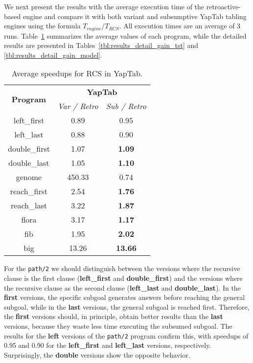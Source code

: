We next present the results with the average execution time of the retroactive-based
engine and compare it with both variant and subsumptive YapTab tabling engines using the formula $T_{engine} / T_{RCS}$.
All execution times are an average of 3 runs. Table~\ref{tbl:results_gain_overview} summarizes the average values of
each program, while the detailed results are presented in Tables~\ref{tbl:results_detail_gain_tst} and
\ref{tbl:results_detail_gain_model}.

\begin{table}[ht]
\centering
  \begin{tabular}{ccc}
   \hline
    \hline
    \multirow{2}{*}{\textbf{Program}} & \multicolumn{2}{c}{\textbf{YapTab}} \\
    & \textit{\small{Var / Retro}} & \textit{\small{Sub / Retro}} \\
   \hline
   \hline
left\_first & 0.89 & 0.95 \\
left\_last & 0.88  & 0.90 \\
double\_first & 1.07 & \textbf{1.09} \\
double\_last & 1.05 & \textbf{1.10} \\
genome & 450.33 & 0.74 \\
reach\_first  & 2.54 & \textbf{1.76} \\
reach\_last  & 3.22 & \textbf{1.87} \\
flora & 3.17 & \textbf{1.17} \\
fib & 1.95 & \textbf{2.02} \\
big & 13.26 & \textbf{13.66} \\
\hline
\hline
\end{tabular}
\caption{Average speedups for RCS in YapTab.}
\label{tbl:results_gain_overview}
\end{table}

For the \texttt{path/2} we should distinguish between the versions where the recursive clause is the first
clause (\textbf{left\_first} and \textbf{double\_first}) and the versions where the recursive clause as the second
clause (\textbf{left\_last} and \textbf{double\_last}). In the \textbf{first} versions, the specific subgoal
generates answers before reaching the general subgoal, while in the \textbf{last} versions, the general subgoal
is reached first. Therefore, the \textbf{first} versions should, in principle, obtain better results than the \textbf{last}
versions, because they waste less time executing the subsumed subgoal. The results for the \textbf{left} versions of the
\texttt{path/2} program confirm this, with speedups of 0.95 and 0.90 for the \textbf{left\_first} and
\textbf{left\_last} versions, respectively. Surprisingly, the \textbf{double} versions show the opposite behavior.

